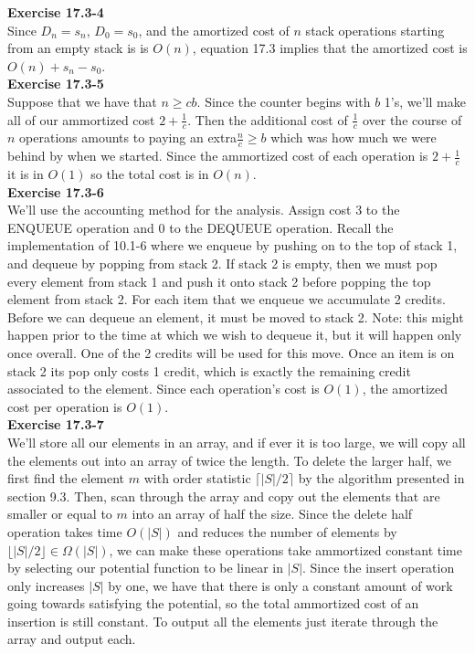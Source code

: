 \documentclass{article}
\begin{document}
\noindent\textbf{Exercise 17.3-4}\\

Since $D_n = s_n$, $D_0 = s_0$, and the amortized cost of $n$ stack operations starting from an empty stack is is $O(n)$, equation 17.3 implies that the amortized cost is $O(n) + s_n - s_0$.\\

\noindent\textbf{Exercise 17.3-5}\\

Suppose that we have that $n\ge c b$. Since the counter begins with $b$ 1's, we'll make all of our ammortized cost $2+ \frac{1}{c}$. Then the additional cost of $\frac{1}{c}$ over the course of $n$ operations amounts to paying an extra$\frac{n}{c} \ge b$ which was how much we were behind by when we started. Since the ammortized cost of each operation is $2+\frac{1}{c}$ it is in $O(1)$ so the total cost is in $O(n)$.\\

\noindent\textbf{Exercise 17.3-6}\\

We'll use the accounting method for the analysis.  Assign cost 3 to the ENQUEUE operation and 0 to the DEQUEUE operation.  Recall the implementation of 10.1-6 where we enqueue by pushing on to the top of stack 1, and dequeue by popping from stack 2.  If stack 2 is empty, then we must pop every element from stack 1 and push it onto stack 2 before popping the top element from stack 2.  For each item that we enqueue we accumulate 2 credits.  Before we can dequeue an element, it must be moved to stack 2.  Note: this might happen prior to the time at which we wish to dequeue it, but it will happen only once overall.  One of the 2 credits will be used for this move.  Once an item is on stack 2 its pop only costs 1 credit, which is exactly the remaining credit associated to the element.  Since each operation's cost is $O(1)$, the amortized cost per operation is $O(1)$.\\

\noindent\textbf{Exercise 17.3-7}\\

We'll store all our elements in an array, and if ever it is too large, we will copy all the elements out into an array of twice the length. To delete the larger half, we first find the element $m$ with order statistic $\lceil|S|/2\rceil$ by the algorithm presented in section 9.3. Then, scan through the array and copy out the elements that are smaller or equal to $m$ into an array of half the size. Since the delete half operation takes time $O(|S|)$ and reduces the number of elements by $\lfloor|S|/2\rfloor \in \Omega(|S|)$, we can make these operations take ammortized constant time by selecting our potential function to be linear in $|S|$. Since the insert operation only increases $|S|$ by one, we have that there is only a constant amount of work going towards satisfying the potential, so the total ammortized cost of an insertion is still constant. To output all the elements just iterate through the array and output each.\\
\end{document}
